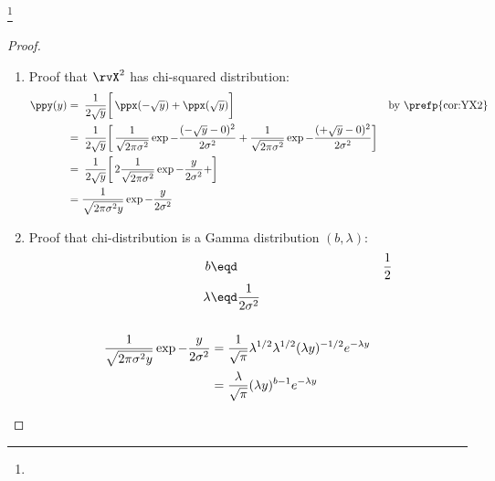 \begin{theorem}
\label{thm:Gamma=X^2}
\footnote{
  }
\mbox{}\\
\end{theorem}
\begin{proof}
\begin{enumerate}

\item Proof that $\rvX^2$ has chi-squared distribution:
\begin{align*}
  \ppy(y)
    &= \left.\left.\frac{1}{2\sqrt{y}}\right[
       \ppx(-\sqrt{y}) + \ppx( \sqrt{y}) \right]
    && \text{by \prefp{cor:YX2}}
  \\&= \left.\left.\frac{1}{2\sqrt{y}}\right[
       \frac{1}{\sqrt{2\pi\sigma^2}} \exp{-\frac{(-\sqrt{y}-0)^2}{2\sigma^2}}+
       \frac{1}{\sqrt{2\pi\sigma^2}} \exp{-\frac{(+\sqrt{y}-0)^2}{2\sigma^2}}
       \right]
  \\&= \left.\left.\frac{1}{2\sqrt{y}}\right[
       2\frac{1}{\sqrt{2\pi\sigma^2}} \exp{-\frac{y}{2\sigma^2}}+
       \right]
  \\&= \frac{1}{\sqrt{2\pi \sigma^2 y}} \exp{-\frac{y}{2\sigma^2}}
\end{align*}

\item Proof that chi-distribution is a Gamma distribution $(b,\lambda)$:
\begin{align*}
  b &\eqd& \frac{1}{2} \\
  \lambda &\eqd \frac{1}{2\sigma^2} \\
\\
  \frac{1}{\sqrt{2\pi\sigma^2y}}\exp{-\frac{y}{2\sigma^2}}
    &= \frac{1}{\sqrt{\pi}}\lambda^{1/2} \lambda^{1/2} (\lambda y)^{-1/2} e^{-\lambda y}
  \\&= \frac{\lambda}{\sqrt{\pi}} (\lambda y)^{b-1} e^{-\lambda y}
\end{align*}

\end{enumerate}
\end{proof}

